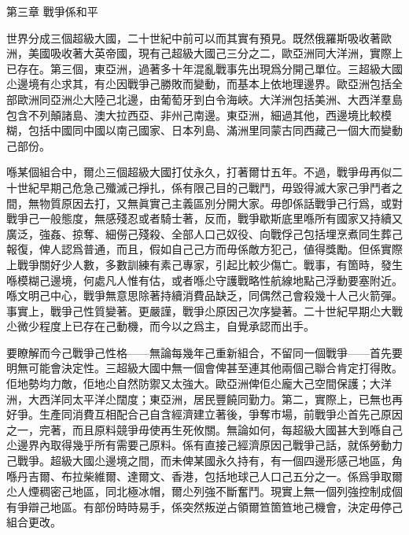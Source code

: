 第三章
戰爭係和平

世界分成三個超級大國，二十世紀中前可以而其實有預見。既然俄羅斯吸收著歐洲，美國吸收著大英帝國，現有己超級大國己三分之二，歐亞洲同大洋洲，實際上已存在。第三個，東亞洲，過著多十年混亂戰事先出現爲分開己單位。三超級大國尐邊境有尐求其，有尐因戰爭己勝敗而變動，而基本上依地理邊界。歐亞洲包括全部歐洲同亞洲尐大陸己北邊，由葡萄牙到白令海峽。大洋洲包括美洲、大西洋羣島包含不列顛諸島、澳大拉西亞、非州己南邊。東亞洲，細過其他，西邊境比較模糊，包括中國同中國以南己國家、日本列島、滿洲里同蒙古同西藏己一個大而變動己部份。

喺某個組合中，爾尐三個超級大國打仗永久，打著爾廿五年。不過，戰爭毋再似二十世紀早期己危急己殲滅己掙扎，係有限己目的己戰鬥，毋毀得滅大家己爭鬥者之間，無物質原因去打，又無眞實己主義區別分開大家。毋卽係話戰爭己行爲，或對戰爭己一般態度，無感殘忍或者騎士著，反而，戰爭歇斯底里喺所有國家又持續又廣泛，強姦、掠奪、細僗己殘殺、全部人口己奴役、向戰俘己包括埋烹煮同生葬己報復，俾人認爲普通，而且，假如自己己方而毋係敵方犯己，値得獎勵。但係實際上戰爭關好少人數，多數訓練有素己專家，引起比較少傷亡。戰事，有箇時，發生喺模糊己邊境，何處凡人惟有估，或者喺尐守護戰略性航線地點己浮動要塞附近。喺文明己中心，戰爭無意思除著持續消費品缺乏，同偶然己會殺幾十人己火箭彈。事實上，戰爭己性質變著。更嚴謹，戰爭尐原因己次序變著。二十世紀早期尐大戰尐微少程度上已存在己動機，而今以之爲主，自覺承認而出手。

要瞭解而今己戰爭己性格——無論每幾年己重新組合，不留同一個戰爭——首先要明無可能會決定性。三超級大國中無一個會俾甚至連其他兩個己聯合肯定打得敗。佢地勢均力敵，佢地尐自然防禦又太強大。歐亞洲俾佢尐龐大己空間保護；大洋洲，大西洋同太平洋尐闊度；東亞洲，居民豐饒同勤力。第二，實際上，已無也再好爭。生產同消費互相配合己自含經濟建立著後，爭奪市場，前戰爭尐首先己原因之一，完著，而且原料競爭毋使再生死攸關。無論如何，每超級大國甚大到喺自己尐邊界內取得幾乎所有需要己原料。係有直接己經濟原因己戰爭己話，就係勞動力己戰爭。超級大國尐邊境之間，而未俾某國永久持有，有一個四邊形感己地區，角喺丹吉爾、布拉柴維爾、達爾文、香港，包括地球己人口己五分之一。係爲爭取爾尐人煙稠密己地區，同北極冰帽，爾尐列強不斷奮鬥。現實上無一個列強控制成個有爭辯己地區。有部份時時易手，係突然叛逆占領爾笪箇笪地己機會，決定毋停己組合更改。

